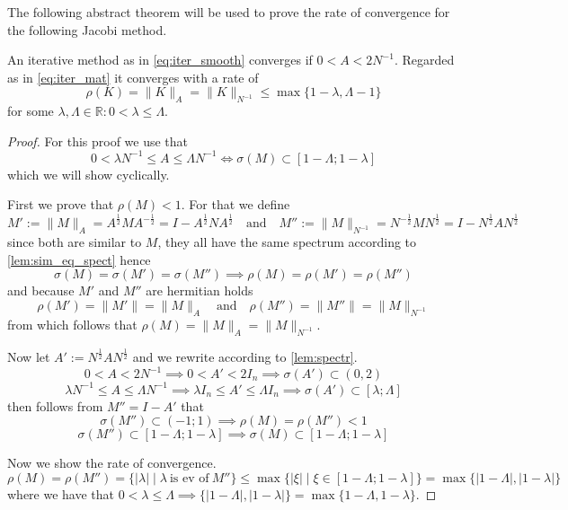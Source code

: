 The following abstract theorem will be used to prove the rate of convergence for the following Jacobi method.
\begin{theorem}\label{thm:jacobi_conv}
   An iterative method as in \cref{eq:iter_smooth} converges if \(0 < A < 2N^{-1}\).
   Regarded as in \cref{eq:iter_mat} it converges with a rate of
   \[\rho(K) = \|K\|_A = \|K\|_{N^{-1}} \leq \max\{1 - \lambda, \Lambda - 1\}\]
   for some \(\lambda, \Lambda \in \mathbb{R}: 0 < \lambda \leq \Lambda\).
\end{theorem}
\begin{proof}
   For this proof we use that
   \[0 < \lambda N^{-1} \leq A \leq \Lambda N^{-1} \iff \sigma(M) \subset [1-\Lambda; 1-\lambda]\]
   which we will show cyclically.

   First we prove that \(\rho(M) < 1\).
   For that we define
   \[M' := \|M\|_A = A^\frac{1}{2}MA^{-\frac{1}{2}} = I - A^\frac{1}{2}NA^\frac{1}{2} \quad\text{and}\quad M'' := \|M\|_{N^{-1}} = N^{-\frac{1}{2}}MN^\frac{1}{2} = I - N^\frac{1}{2}AN^\frac{1}{2}\]
   since both are similar to \(M\), they all have the same spectrum according to \cref{lem:sim_eq_spect} hence
   \[\sigma(M) = \sigma(M') = \sigma(M'') \implies \rho(M) = \rho(M') = \rho(M'')\]
   and because \(M'\) and \(M''\) are hermitian holds
   \[\rho(M') = \|M'\| = \|M\|_A \quad\text{and}\quad \rho(M'') = \|M''\| = \|M\|_{N^{-1}}\]
   from which follows that \(\rho(M) = \|M\|_A = \|M\|_{N^{-1}}\).

   Now let \(A' := N^\frac{1}{2}AN^\frac{1}{2}\) and we rewrite according to \cref{lem:spectr}.
   \[0 < A < 2N^{-1}\implies 0 < A' < 2I_n \implies \sigma(A') \subset (0, 2)\]
   \[\lambda N^{-1} \leq A \leq \Lambda N^{-1} \implies \lambda I_n \leq A' \leq \Lambda I_n \implies \sigma(A') \subset [\lambda; \Lambda]\]
   then follows from \(M'' = I - A'\) that
   \[\sigma(M'') \subset (-1; 1) \implies \rho(M) = \rho(M'') < 1\]
   \[\sigma(M'') \subset [1-\Lambda; 1-\lambda] \implies \sigma(M) \subset [1-\Lambda; 1-\lambda]\]

   Now we show the rate of convergence.
   \[\rho(M) = \rho(M'') = \{|\lambda| \mid \lambda~\text{is ev of}~M''\} \leq \max\{|\xi| \mid \xi \in [1-\Lambda; 1-\lambda]\} = \max\{|1-\Lambda|, |1-\lambda|\}\]
   where we have that \(0 < \lambda \leq \Lambda \implies \{|1-\Lambda|, |1-\lambda|\} = \max\{1-\Lambda, 1-\lambda\}\).


\end{proof}
